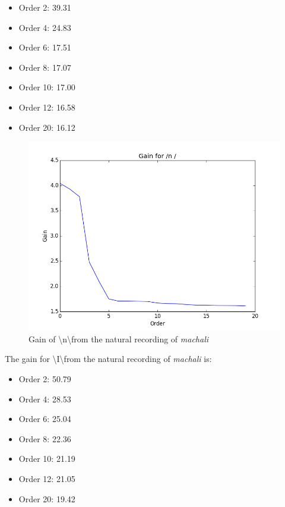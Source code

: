 \documentclass[a4paper]{article}
\begin{document}
\begin{itemize}
\item Order 2: 39.31 
\item Order 4: 24.83
\item Order 6: 17.51
\item Order 8: 17.07
\item Order 10: 17.00
\item Order 12: 16.58
\item Order 20: 16.12
\end{itemize}  
\begin{figure}[h!]
    \includegraphics[width=\linewidth]{./images/gain_n.png}
    \caption{Gain of \textbackslash n\textbackslash from the natural recording of \textit{machali}}
    \label{fig:1}
\end{figure}


The gain for \textbackslash I\textbackslash from the natural recording of \textit{machali} is: 
\begin{itemize}
\item Order 2: 50.79 
\item Order 4: 28.53
\item Order 6: 25.04
\item Order 8: 22.36
\item Order 10: 21.19
\item Order 12: 21.05
\item Order 20: 19.42
\end{itemize}  
\end{document}
